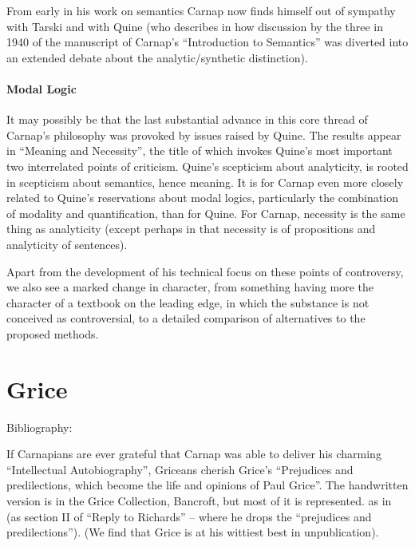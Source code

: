 \documentclass[10pt,titlepage]{book}
\begin{document}
From early in his work on semantics Carnap now finds himself out of sympathy with Tarski and with Quine (who describes in \cite{quineAB}\cite{quine86} how discussion by the three in 1940 of the manuscript of Carnap's ``Introduction to Semantics'' was diverted into an extended debate about the analytic/synthetic distinction).

\subsubsection{Modal Logic}

It may possibly be that the last substantial advance in this core thread of Carnap's philosophy was provoked by issues raised by Quine.
The results appear in ``Meaning and Necessity'', the title of which invokes Quine's most important two interrelated points of criticism.
Quine's scepticism about analyticity, is rooted in scepticism about semantics, hence meaning.
It is for Carnap even more closely related to Quine's reservations about modal logics, particularly the combination of modality and quantification, than for Quine.
For Carnap, necessity is the same thing as analyticity (except perhaps in that necessity is of propositions and analyticity of sentences).

Apart from the development of his technical focus on these points of controversy, we also see a marked change in character, from something having more the character of a textbook on the leading edge, in which the substance is not conceived as controversial, to a detailed comparison of alternatives to the proposed methods.

\chapter{Grice}

Bibliography:
\cite{grice41}
\cite{grice86}
\cite{grice86a}
\cite{grice87}
\cite{grice88}
\cite{grice89}
\cite{grice91}
\cite{grice01}
\cite{grice57}
\cite{pears57}
\cite{speranza89}
\cite{speranza91a}
\cite{speranza91b}
\cite{speranza95}

If Carnapians are ever grateful that Carnap was able to deliver his charming ``Intellectual Autobiography'', Griceans cherish Grice's ``Prejudices and predilections, which become the life and opinions of Paul Grice''\cite{grice86c}.
The handwritten version is in the Grice Collection, Bancroft, but most of it is represented. as \cite{grice86c} in \cite{grice86a} (as section II of ``Reply to Richards'' -- where he drops the ``prejudices and predilections'').
(We find that Grice is at his wittiest best in unpublication).
\end{document}
